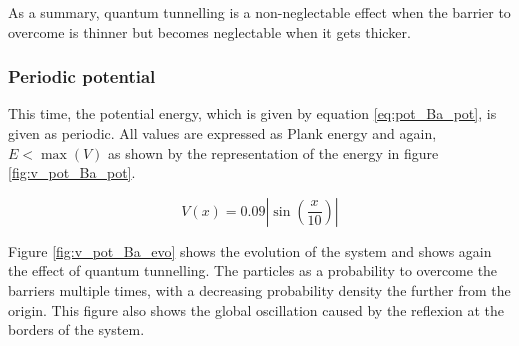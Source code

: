 \documentclass[a4paper,12pt,twoside]{article}
\newcommand{\bracket}[1]{\left(#1\right)}
\newcommand{\abs}[1]{\left|#1\right|}
\begin{document}
        As a summary, quantum tunnelling is a non-neglectable effect when the barrier to overcome is thinner but becomes neglectable when it gets thicker.

      \subsubsection{Periodic potential}
      This time, the potential energy, which is given by equation \eqref{eq:pot_Ba_pot}, is given as periodic.
      All values are expressed as Plank energy and again, $E<\max\bracket{V}$ as shown by the representation of the energy in figure \ref{fig:v_pot_Ba_pot}.

      \begin{equation}
        V(x) = 0.09\abs{\sin\bracket{\frac{x}{10}}}
        \label{eq:pot_Ba_pot}
      \end{equation}

      Figure \ref{fig:v_pot_Ba_evo} shows the evolution of the system and shows again the effect of quantum tunnelling.
      The particles as a probability to overcome the barriers multiple times, with a decreasing probability density the further from the origin.
      This figure also shows the global oscillation caused by the reflexion at the borders of the system.
\end{document}
